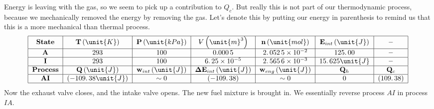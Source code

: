 \documentclass{article}
\begin{document}
Energy is leaving with the gas, so we seem to pick up a contribution to $%
Q_{c}.$ But really this is not part of our thermodynamic process, because we
mechanically removed the energy by removing the gas. Let's denote this by
putting our energy in parenthesis to remind us that this is a more
mechanical than thermal process.%
\[
\begin{tabular}{|c|c|c|c|c|c|c|}
\hline
\textbf{State} & $\mathbf{T}\left( \unit{K}\right) $ & $\mathbf{P}\left( 
\unit{kPa}\right) $ & $%
\ooalign{\hfil$V$\hfil\cr\kern0.1em--\hfil\cr}%
\left( \unit{m}^{3}\right) $ & $\mathbf{n}\left( \unit{mol}\right) $ & $%
\mathbf{E}_{int}\left( \unit{J}\right) $ & \textbf{--} \\ \hline
$\mathbf{A}$ & $293$ & $100$ & $0.000\,5$ & $2.\,052\,5\times 10^{-2}$ & $%
\allowbreak 125.\,\allowbreak 00$ & \textbf{--} \\ \hline
$\mathbf{I}$ & $293$ & $100$ & $6.\,25\times 10^{-5}$ & $2.\,\allowbreak
565\,6\times 10^{-3}$ & $15.\,\allowbreak 625\unit{J}$ & \textbf{--} \\ 
\hline
\textbf{Process} & $\mathbf{Q}\left( \unit{J}\right) $ & $\mathbf{w}%
_{int}\left( \unit{J}\right) $ & $\mathbf{\Delta E}_{int}\left( \unit{J}%
\right) $ & $\mathbf{w}_{eng}\left( \unit{J}\right) $ & $\mathbf{Q}_{h}$ & $%
\mathbf{Q}_{c}$ \\ \hline
$\mathbf{AI}$ & $\left( -109.\,\allowbreak 38\unit{J}\right) $ & $\sim 0$ & $%
\left( -109.\,\allowbreak 38\right) $ & $\sim 0$ & $0$ & $\left(
109.\,\allowbreak 38\right) $ \\ \hline
\end{tabular}%
\]%
$\allowbreak $Now the exhaust valve closes, and
the intake valve opens. The new fuel mixture is brought in. We essentially
reverse process $AI$ in process $IA.$ 
\end{document}

